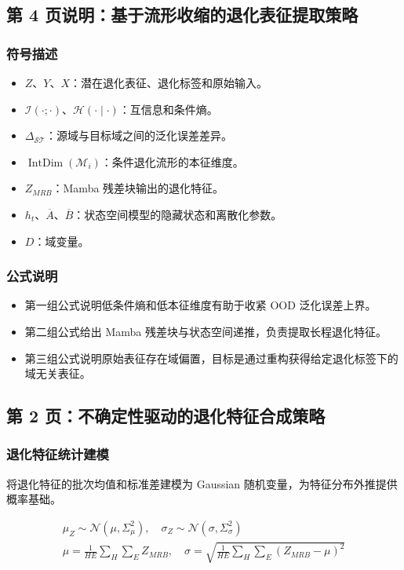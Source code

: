 ﻿\documentclass[UTF8,a4paper,10pt]{ctexart}
\begin{document}
\clearpage
\subsection*{第 4 页说明：基于流形收缩的退化表征提取策略}
\subsubsection*{符号描述}
\begin{itemize}
  \item $Z$、$Y$、$X$：潜在退化表征、退化标签和原始输入。
  \item $\mathcal{I}(\cdot;\cdot)$、$\mathcal{H}(\cdot\mid\cdot)$：互信息和条件熵。
  \item $\Delta_{\mathcal{S}\mathcal{T}}$：源域与目标域之间的泛化误差差异。
  \item $\operatorname{IntDim}(\mathcal{M}_i)$：条件退化流形的本征维度。
  \item $Z_{MRB}$：Mamba 残差块输出的退化特征。
  \item $h_t$、$\overline A$、$\overline B$：状态空间模型的隐藏状态和离散化参数。
  \item $D$：域变量。
\end{itemize}
\subsubsection*{公式说明}
\begin{itemize}
  \item 第一组公式说明低条件熵和低本征维度有助于收紧 OOD 泛化误差上界。
  \item 第二组公式给出 Mamba 残差块与状态空间递推，负责提取长程退化特征。
  \item 第三组公式说明原始表征存在域偏置，目标是通过重构获得给定退化标签下的域无关表征。
\end{itemize}

\clearpage
\subsection{第 2 页：不确定性驱动的退化特征合成策略}

\subsubsection*{退化特征统计建模}
将退化特征的批次均值和标准差建模为 Gaussian 随机变量，为特征分布外推提供概率基础。
\begin{formulabox}
\[\begin{gathered}
  \mu_Z \sim \mathcal{N}(\mu,\Sigma_{\mu}^{2}),
  \quad
  \sigma_Z \sim \mathcal{N}(\sigma,\Sigma_{\sigma}^{2}) \\
  \mu = \frac{1}{HE}\sum_H\sum_E Z_{MRB}, \quad
  \sigma = \sqrt{\frac{1}{HE}\sum_H\sum_E (Z_{MRB}-\mu)^2}
\end{gathered}\]
\end{formulabox}
\end{document}
